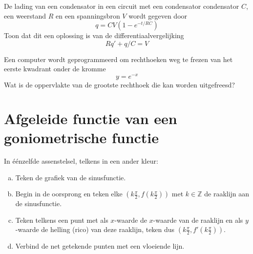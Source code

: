 \documentclass[a4paper,12pt]{article}
\begin{document}
\begin{oefening} 
De lading van een condensator in een circuit met een condensator condensator $C$, een weerstand $R$ en een spanningsbron $V$ wordt gegeven door
$$q=CV(1-e^{-t/RC})$$
Toon dat dit een oplossing is van de differentiaalvergelijking
$$Rq'+q/C=V$$
\end{oefening}

\begin{oefening}
Een computer wordt geprogrammeerd om rechthoeken weg te frezen van het eerste kwadrant onder de kromme
    $$y = e^{-x}$$
Wat is de oppervlakte van de grootste rechthoek die kan worden uitgefreesd?\\
\begin{center}
\end{center}
\end{oefening}


\pagebreak
\section{Afgeleide functie van een goniometrische functie}

\begin{oefening}
In éénzelfde assenstelsel, telkens in een ander kleur:
\begin{enumerate}[(a)]
  \item Teken de grafiek van de sinusfunctie. 
  \item Begin in de oorsprong en teken elke $(k\frac{\pi}{2}, f(k\frac{\pi}{2}))$ met $k\in\mathbb{Z}$ de raaklijn aan de sinusfunctie.
  \item Teken telkens een punt met als $x$-waarde de $x$-waarde van de raaklijn en als $y$-waarde de helling (rico) van deze raaklijn, teken dus $(k\frac{\pi}{2}, f'(k\frac{\pi}{2}))$.
  \item Verbind de net getekende punten met een vloeiende lijn.
\end{enumerate}
\end{oefening}
\end{document}
